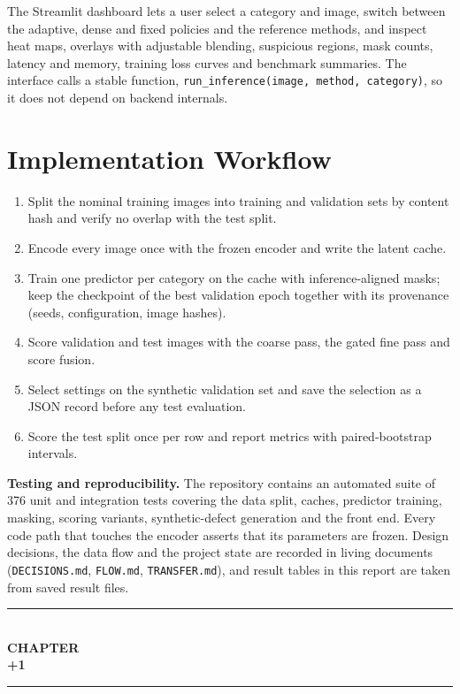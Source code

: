 \documentclass[12pt,a4paper,oneside]{report}
\newcommand{\chapterseparator}{
    \clearpage
    \thispagestyle{empty}
    \begin{center}
        \vspace*{5cm}
        \rule{0.65\textwidth}{0.5pt}\\[1.2cm]
        {\fontsize{16}{20}\selectfont\bfseries CHAPTER}\\[0.8cm]
        {\fontsize{24}{28}\selectfont\bfseries \the\numexpr\value{chapter}+1\relax}\\[1.2cm]
        \rule{0.65\textwidth}{0.5pt}
    \end{center}
    \clearpage
}
\begin{document}
The Streamlit dashboard lets a user select a category and image, switch
between the adaptive, dense and fixed policies and the reference methods,
and inspect heat maps, overlays with adjustable blending, suspicious
regions, mask counts, latency and memory, training loss curves and benchmark
summaries. The interface calls a stable function,
\texttt{run\_inference(image, method, category)}, so it does not depend on
backend internals.

\section{Implementation Workflow}

\begin{enumerate}[leftmargin=*]
    \item Split the nominal training images into training and validation
    sets by content hash and verify no overlap with the test split.
    \item Encode every image once with the frozen encoder and write the
    latent cache.
    \item Train one predictor per category on the cache with inference-aligned
    masks; keep the checkpoint of the best validation epoch together with its
    provenance (seeds, configuration, image hashes).
    \item Score validation and test images with the coarse pass, the gated
    fine pass and score fusion.
    \item Select settings on the synthetic validation set and save the
    selection as a JSON record before any test evaluation.
    \item Score the test split once per row and report metrics with
    paired-bootstrap intervals.
\end{enumerate}

\textbf{Testing and reproducibility.} The repository contains an automated
suite of 376 unit and integration tests covering the data split, caches,
predictor training, masking, scoring variants, synthetic-defect generation
and the front end. Every code path that touches the encoder asserts that its
parameters are frozen. Design decisions, the data flow and the project state
are recorded in living documents (\texttt{DECISIONS.md}, \texttt{FLOW.md},
\texttt{TRANSFER.md}), and result tables in this report are taken from saved
result files.

\chapterseparator
\end{document}
